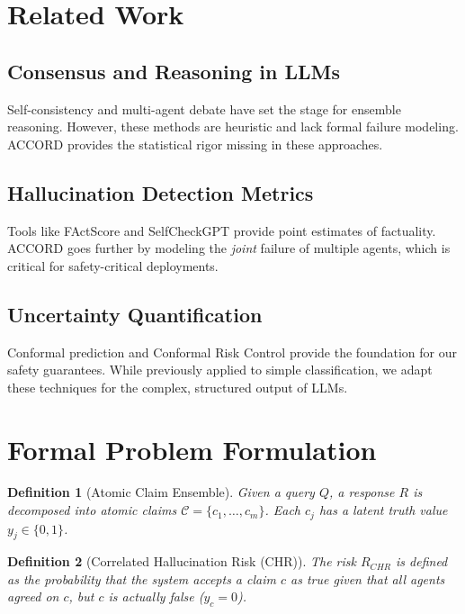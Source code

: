 \documentclass[conference]{IEEEtran}
\newtheorem{definition}{Definition}
\begin{document}
\section{Related Work}

\subsection{Consensus and Reasoning in LLMs}
Self-consistency \cite{wang2022selfconsistency} and multi-agent debate \cite{du2023debate} have set the stage for ensemble reasoning. However, these methods are heuristic and lack formal failure modeling. ACCORD provides the statistical rigor missing in these approaches.

\subsection{Hallucination Detection Metrics}
Tools like FActScore \cite{min2023factscore} and SelfCheckGPT \cite{manakul2023selfcheckgpt} provide point estimates of factuality. ACCORD goes further by modeling the \textit{joint} failure of multiple agents, which is critical for safety-critical deployments.

\subsection{Uncertainty Quantification}
Conformal prediction \cite{vovk2005} and Conformal Risk Control \cite{angelopoulos2022crc} provide the foundation for our safety guarantees. While previously applied to simple classification, we adapt these techniques for the complex, structured output of LLMs.

\section{Formal Problem Formulation}

\begin{definition}[Atomic Claim Ensemble]
Given a query $Q$, a response $R$ is decomposed into atomic claims $\mathcal{C} = \{c_1, \dots, c_m\}$. Each $c_j$ has a latent truth value $y_j \in \{0, 1\}$.
\end{definition}

\begin{definition}[Correlated Hallucination Risk (CHR)]
The risk $R_{CHR}$ is defined as the probability that the system accepts a claim $c$ as true given that all agents agreed on $c$, but $c$ is actually false ($y_c=0$).
\end{definition}
\end{document}
